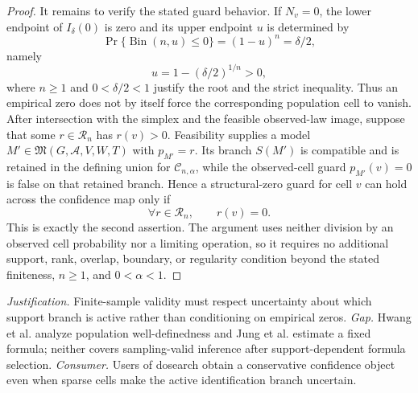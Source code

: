 \documentclass{article}
\begin{document}
\begin{proof}
It remains to verify the stated guard behavior.  If \(N_v=0\), the lower endpoint of \(I_\delta(0)\) is zero and its upper endpoint \(u\) is determined by
\[
 \Pr\{\operatorname{Bin}(n,u)\leq0\}
 =(1-u)^n=\delta/2,
\]
namely
\[
 u=1-(\delta/2)^{1/n}>0,
\]
where \(n\geq1\) and \(0<\delta/2<1\) justify the root and the strict inequality.  Thus an empirical zero does not by itself force the corresponding population cell to vanish.  After intersection with the simplex and the feasible observed-law image, suppose that some \(r\in\mathcal R_n\) has \(r(v)>0\).  Feasibility supplies a model \(M'\in\mathfrak M(G,\mathcal A,V,W,T)\) with \(p_{M'}=r\).  Its branch \(S(M')\) is compatible and is retained in the defining union for \(\mathcal C_{n,\alpha}\), while the observed-cell guard \(p_{M'}(v)=0\) is false on that retained branch.  Hence a structural-zero guard for cell \(v\) can hold across the confidence map only if
\[
 \forall r\in\mathcal R_n,\qquad r(v)=0.
\]
This is exactly the second assertion.  The argument uses neither division by an observed cell probability nor a limiting operation, so it requires no additional support, rank, overlap, boundary, or regularity condition beyond the stated finiteness, \(n\geq1\), and \(0<\alpha<1\).
\end{proof}
\par\smallskip\noindent \textit{Justification.} Finite-sample validity must respect uncertainty about which support branch is active rather than conditioning on empirical zeros. \textit{Gap.} Hwang et al. analyze population well-definedness and Jung et al. estimate a fixed formula; neither covers sampling-valid inference after support-dependent formula selection. \textit{Consumer.} Users of dosearch obtain a conservative confidence object even when sparse cells make the active identification branch uncertain.
\end{document}
